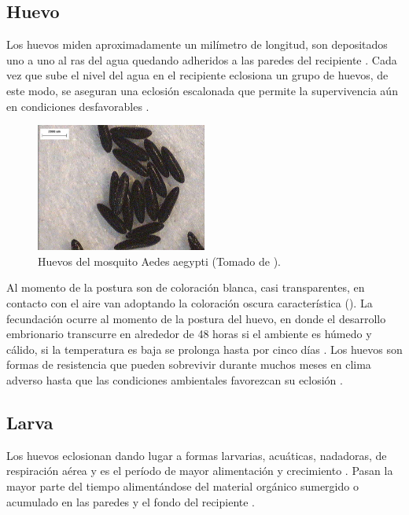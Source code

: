 \subsection{Huevo}
\label{subsec:ciclo-biologico-huevo}
Los huevos miden aproximadamente un milímetro de longitud, son depositados uno a uno al ras del agua quedando adheridos a las paredes del recipiente \cite{ThironIzcazaJ2003}. Cada vez que sube el
nivel del agua en el recipiente eclosiona un grupo de huevos, de este modo, se aseguran una
eclosión escalonada que permite la supervivencia aún en condiciones desfavorables
\cite{directricesDetvArg}.

\begin{figure}[!htbp]
\centering
\includegraphics[width=0.5\textwidth]{capitulo-3/graphics/huevos.png}
\caption{\label{fig:cap3-huevos} Huevos del mosquito Aedes aegypti (Tomado de
\cite{sivanathan2006ecology}).}
\end{figure}

Al momento de la postura son de coloración blanca, casi transparentes, en contacto con el aire van
adoptando la coloración oscura característica \cite{directricesDetvArg} ().
La fecundación ocurre al momento de la postura del huevo, en donde el desarrollo embrionario
transcurre en alrededor de 48 horas si el ambiente es húmedo y cálido, si la temperatura es baja
se prolonga hasta por cinco días \cite{ThironIzcazaJ2003}. Los huevos son formas de resistencia que
pueden sobrevivir durante muchos meses en clima adverso hasta que las condiciones ambientales
favorezcan su eclosión \cite{directricesDetvArg}.

\subsection{Larva}
\label{subsec:ciclo-biologico-larva}
Los huevos eclosionan dando lugar a formas larvarias, acuáticas, nadadoras, de respiración aérea
\cite{directricesDetvArg} y es el período de mayor alimentación y crecimiento
\cite{web-site:gMonteroBiologia}. Pasan la mayor parte del tiempo alimentándose del material
orgánico sumergido o acumulado en las paredes y el fondo del recipiente
\cite{web-site:gMonteroBiologia, directricesDetvArg}.

